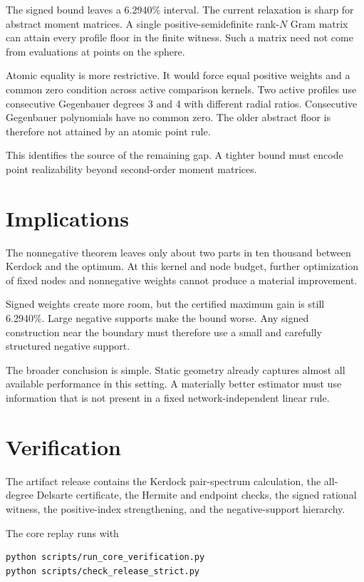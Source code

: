 \documentclass[11pt]{article}
\begin{document}
The signed bound leaves a 6.2940\% interval. The current relaxation is
sharp for abstract moment matrices. A single positive-semidefinite
rank-\(N\) Gram matrix can attain every profile floor in the finite
witness. Such a matrix need not come from evaluations at points on the
sphere.

Atomic equality is more restrictive. It would force equal positive
weights and a common zero condition across active comparison kernels.
Two active profiles use consecutive Gegenbauer degrees 3 and 4 with
different radial ratios. Consecutive Gegenbauer polynomials have no
common zero. The older abstract floor is therefore not attained by an
atomic point rule.

This identifies the source of the remaining gap. A tighter bound must
encode point realizability beyond second-order moment matrices.

\section{Implications}\label{implications}

The nonnegative theorem leaves only about two parts in ten thousand
between Kerdock and the optimum. At this kernel and node budget, further
optimization of fixed nodes and nonnegative weights cannot produce a
material improvement.

Signed weights create more room, but the certified maximum gain is still
6.2940\%. Large negative supports make the bound worse. Any signed
construction near the boundary must therefore use a small and carefully
structured negative support.

The broader conclusion is simple. Static geometry already captures
almost all available performance in this setting. A materially better
estimator must use information that is not present in a fixed
network-independent linear rule.

\section{Verification}\label{verification}

The artifact release contains the Kerdock pair-spectrum calculation, the
all-degree Delsarte certificate, the Hermite and endpoint checks, the
signed rational witness, the positive-index strengthening, and the
negative-support hierarchy.

The core replay runs with

\begin{verbatim}
python scripts/run_core_verification.py
python scripts/check_release_strict.py
\end{verbatim}
\end{document}
